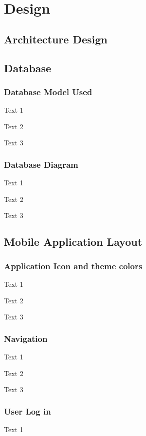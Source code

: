 \chapter{Design}
\label{chap:design}

\section{Architecture Design} \label{sec:d1}

\section{Database} \label{sec:d2}

\subsection{Database Model Used} \label{sec:d2.1}
Text 1

Text 2

Text 3

\subsection{Database Diagram} \label{sec:d2.2}
Text 1

Text 2

Text 3

\section{Mobile Application Layout} \label{sec:d3}

\subsection{Application Icon and theme colors} \label{sec:d3.1}
Text 1

Text 2

Text 3

\subsection{Navigation} \label{sec:d3.2}
Text 1

Text 2

Text 3

\subsection{User Log in} \label{sec:d3.3}
Text 1

